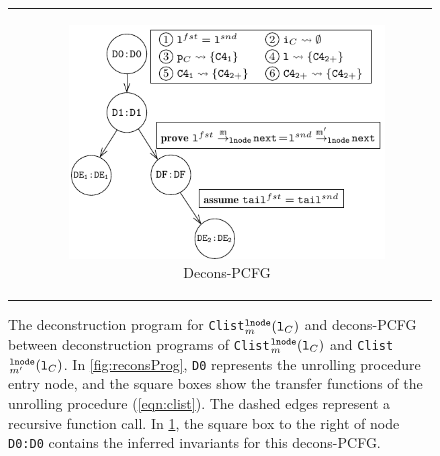 \begin{figure}[t]
\begin{tabular}{cc}
&
\begin{subfigure}[b]{0.1\textwidth}
\includegraphics[scale=1]{chapters/figures/figClistProductCfg.pdf}
\caption{\label{fig:reconsPCFG}Decons-PCFG}
\end{subfigure}%
\\
\end{tabular}
\caption{\label{fig:recons}The deconstruction program for {\tt Clist}$_m^{\tt lnode}({\tt l}_C)$ and decons-PCFG between deconstruction programs of {\tt Clist}$_m^{\tt lnode}({\tt l}_C)$ and {\tt Clist}$_{m'}^{\tt lnode}({\tt l}_C)$.
In \cref{fig:reconsProg}, {\tt D0} represents the unrolling procedure entry node, and the square boxes show the transfer functions of the unrolling procedure (\cref{eqn:clist}).
The dashed edges represent a recursive function call.
In \cref{fig:reconsPCFG}, the square box to the right of node {\tt D0:D0} contains the inferred invariants for this decons-PCFG.}
\end{figure}
